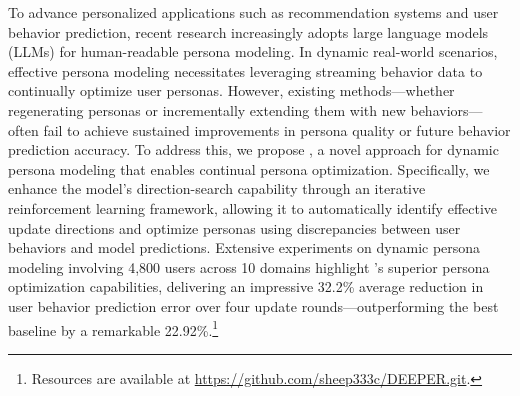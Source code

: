 





To advance personalized applications such as recommendation systems and user behavior prediction, recent research increasingly adopts large language models (LLMs) for human-readable persona modeling. 
In dynamic real-world scenarios, effective persona modeling necessitates leveraging streaming behavior data to continually optimize user personas.
However, existing methods—whether regenerating personas or incrementally extending them with new behaviors—often fail to achieve sustained improvements in persona quality or future behavior prediction accuracy.
To address this, we propose \method, a novel approach for dynamic persona modeling that enables continual persona optimization.
Specifically, we enhance the model’s direction-search capability through an iterative reinforcement learning framework, allowing it to automatically identify effective update directions and optimize personas using discrepancies between user behaviors and model predictions.
Extensive experiments on dynamic persona modeling involving 4,800 users across 10 domains highlight \method’s superior persona optimization capabilities, delivering an impressive 32.2\% average reduction in user behavior prediction error over four update rounds—outperforming the best baseline by a remarkable 22.92\%.\footnote{Resources are available at \url{https://github.com/sheep333c/DEEPER.git}.}













 


